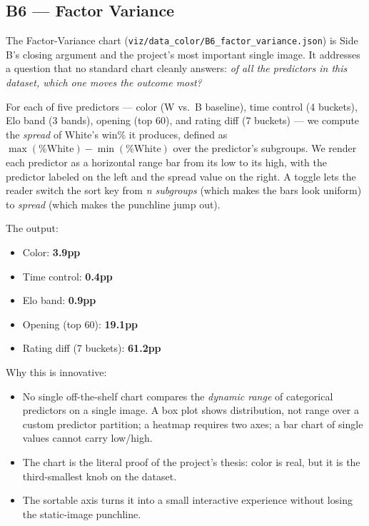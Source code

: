 \documentclass[sigconf,nonacm,natbib=false]{acmart}
\begin{document}
\subsection{B6 --- Factor Variance}

The Factor-Variance chart
(\texttt{viz/data\_color/B6\_factor\_variance.json}) is Side B's
closing argument and the project's most important single image. It
addresses a question that no standard chart cleanly answers: \emph{of
all the predictors in this dataset, which one moves the outcome
most?}

For each of five predictors --- color (W vs.\ B baseline), time
control (4 buckets), Elo band (3 bands), opening (top 60), and
rating diff (7 buckets) --- we compute the \emph{spread} of White's
win\% it produces, defined as $\max(\%\mathrm{White}) -
\min(\%\mathrm{White})$ over the predictor's subgroups. We render
each predictor as a horizontal range bar from its low to its high,
with the predictor labeled on the left and the spread value on the
right. A toggle lets the reader switch the sort key from \emph{n
subgroups} (which makes the bars look uniform) to \emph{spread}
(which makes the punchline jump out).

The output:
\begin{itemize}
\item Color: \textbf{3.9pp}
\item Time control: \textbf{0.4pp}
\item Elo band: \textbf{0.9pp}
\item Opening (top 60): \textbf{19.1pp}
\item Rating diff (7 buckets): \textbf{61.2pp}
\end{itemize}

Why this is innovative:
\begin{itemize}
\item No single off-the-shelf chart compares the \emph{dynamic
  range} of categorical predictors on a single image. A box plot
  shows distribution, not range over a custom predictor partition;
  a heatmap requires two axes; a bar chart of single values cannot
  carry low/high.
\item The chart is the literal proof of the project's thesis: color
  is real, but it is the third-smallest knob on the dataset.
\item The sortable axis turns it into a small interactive
  experience without losing the static-image punchline.
\end{itemize}

\end{document}
